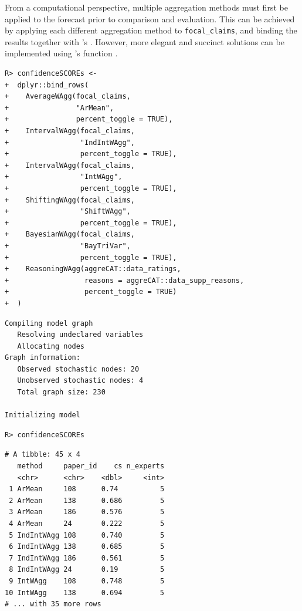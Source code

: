 \documentclass[article]{jss}
\newcommand{\fct}[1]{\code{#1()}}
\begin{document}
From a computational perspective, multiple aggregation methods must
first be applied to the forecast prior to comparison and evaluation.
This can be achieved by applying each different aggregation method to
\texttt{focal\_claims}, and binding the results together with
's \fct{row_bind}. However, more elegant and succinct
solutions can be implemented using 's \fct{map_dfr} function
\citep[see Listing~\ref{lst-multi-method-workflow-non-supp} and
Listing~\ref{lst-multi-method-workflow-both}]{purrr2020}.

\begin{verbatim}
R> confidenceSCOREs <- 
+  dplyr::bind_rows(
+    AverageWAgg(focal_claims,
+                "ArMean", 
+                percent_toggle = TRUE),
+    IntervalWAgg(focal_claims,
+                 "IndIntWAgg", 
+                 percent_toggle = TRUE),
+    IntervalWAgg(focal_claims,
+                 "IntWAgg", 
+                 percent_toggle = TRUE),
+    ShiftingWAgg(focal_claims,
+                 "ShiftWAgg", 
+                 percent_toggle = TRUE),
+    BayesianWAgg(focal_claims,
+                 "BayTriVar", 
+                 percent_toggle = TRUE),
+    ReasoningWAgg(aggreCAT::data_ratings, 
+                  reasons = aggreCAT::data_supp_reasons, 
+                  percent_toggle = TRUE)
+  )
\end{verbatim}

\begin{verbatim}
Compiling model graph
   Resolving undeclared variables
   Allocating nodes
Graph information:
   Observed stochastic nodes: 20
   Unobserved stochastic nodes: 4
   Total graph size: 230

Initializing model
\end{verbatim}

\begin{verbatim}
R> confidenceSCOREs
\end{verbatim}

\begin{verbatim}
# A tibble: 45 x 4
   method     paper_id    cs n_experts
   <chr>      <chr>    <dbl>     <int>
 1 ArMean     108      0.74          5
 2 ArMean     138      0.686         5
 3 ArMean     186      0.576         5
 4 ArMean     24       0.222         5
 5 IndIntWAgg 108      0.740         5
 6 IndIntWAgg 138      0.685         5
 7 IndIntWAgg 186      0.561         5
 8 IndIntWAgg 24       0.19          5
 9 IntWAgg    108      0.748         5
10 IntWAgg    138      0.694         5
# ... with 35 more rows
\end{verbatim}
\end{document}

